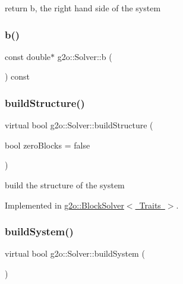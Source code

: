 return b, the right hand side of the system 

\mbox{\label{classg2o_1_1_solver_a812d5cad59fed145c3f47bcf99419a97}} 
\subsubsection{\texorpdfstring{b()}{b()}\hspace{0.1cm}{\footnotesize\ttfamily [2/2]}}
{\footnotesize\ttfamily const double$\ast$ g2o\+::\+Solver\+::b (\begin{DoxyParamCaption}{ }\end{DoxyParamCaption}) const\hspace{0.3cm}{\ttfamily [inline]}}

\mbox{\label{classg2o_1_1_solver_a6c93ac0f528ffe05867d33150c54f46f}} 
\subsubsection{\texorpdfstring{build\+Structure()}{buildStructure()}}
{\footnotesize\ttfamily virtual bool g2o\+::\+Solver\+::build\+Structure (\begin{DoxyParamCaption}\item[{bool}]{zero\+Blocks = {\ttfamily false} }\end{DoxyParamCaption})\hspace{0.3cm}{\ttfamily [pure virtual]}}

build the structure of the system 

Implemented in \mbox{\hyperlink{classg2o_1_1_block_solver_a17e4392d3cca9a9d7cf38bb46d073b86}{g2o\+::\+Block\+Solver$<$ Traits $>$}}.

\mbox{\label{classg2o_1_1_solver_ac1565e85d5ca68a87ad7f06f8164a8c0}} 
\subsubsection{\texorpdfstring{build\+System()}{buildSystem()}}
{\footnotesize\ttfamily virtual bool g2o\+::\+Solver\+::build\+System (\begin{DoxyParamCaption}{ }\end{DoxyParamCaption})\hspace{0.3cm}{\ttfamily [pure virtual]}}

